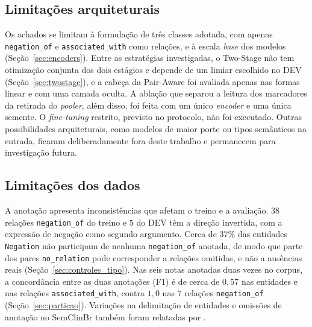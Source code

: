 \subsection{Limitações arquiteturais}

Os achados se limitam à formulação de três classes adotada, com apenas
\texttt{negation\_of} e \texttt{associated\_with} como relações, e à escala
\emph{base} dos modelos (Seção~\ref{sec:encoders}). Entre as estratégias
investigadas, o Two-Stage não tem otimização conjunta dos dois estágios e depende de
um limiar escolhido no DEV (Seção~\ref{sec:twostage}), e a cabeça da Pair-Aware foi avaliada apenas nas formas linear e com uma camada oculta. A ablação que separou a leitura dos marcadores da retirada do \emph{pooler}, além disso, foi feita com um único \emph{encoder} e uma única semente. O \emph{fine-tuning}
restrito, previsto no protocolo, não foi executado. Outras possibilidades
arquiteturais, como modelos de maior porte ou tipos semânticos na entrada, ficaram
deliberadamente fora deste trabalho e permanecem para investigação futura.

\subsection{Limitações dos dados}

A anotação apresenta inconsistências que afetam o treino e a avaliação. $38$
relações \texttt{negation\_of} do treino e $5$ do DEV têm a direção invertida, com a
expressão de negação como segundo argumento. Cerca de $37\%$ das entidades
\texttt{Negation} não participam de nenhuma \texttt{negation\_of} anotada, de modo
que parte dos pares \texttt{no\_relation} pode corresponder a relações omitidas, e
não a ausências reais (Seção~\ref{sec:controles_tipo}). Nas seis notas anotadas duas
vezes no corpus, a concordância entre as duas anotações (F1) é de cerca de $0{,}57$
nas entidades e nas relações \texttt{associated\_with}, contra $1{,}0$ nas $7$
relações \texttt{negation\_of} (Seção~\ref{sec:particao}). Variações na delimitação
de entidades e omissões de anotação no SemClinBr também foram relatadas por
.

